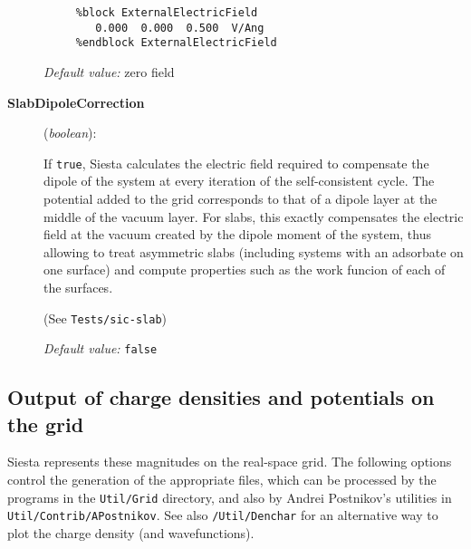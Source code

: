 \documentclass[11pt]{article}
\begin{document}
\begin{description}
\begin{verbatim}
     %block ExternalElectricField
        0.000  0.000  0.500  V/Ang
     %endblock ExternalElectricField
\end{verbatim}

{\it Default value:} zero field

\item[{\bf SlabDipoleCorrection}] ({\it boolean}):

If {\tt true}, {\sc Siesta} calculates the electric field required to
compensate the dipole of the system at every iteration of the
self-consistent cycle. The potential added to the grid corresponds to
that of a dipole layer at the middle of the vacuum layer. For slabs,
this exactly compensates the electric field at the vacuum created by
the dipole moment of the system, thus allowing to treat asymmetric
slabs (including systems with an adsorbate on one surface) and compute
properties such as the work funcion of each of the surfaces.

(See {\tt Tests/sic-slab})

{\it Default value:} {\tt false}

\end{description}


\vspace{5pt}
\subsection{Output of charge densities and potentials on the grid}

{\sc Siesta} represents these magnitudes on the real-space grid. The
following options control the generation of the appropriate files,
which can be processed by the programs in the {\tt Util/Grid}
directory, and also by Andrei Postnikov's utilities in {\tt
  Util/Contrib/APostnikov}. See also {\tt /Util/Denchar} for an
alternative way to plot the charge density (and wavefunctions).
\end{document}
